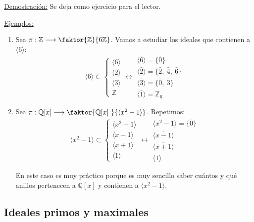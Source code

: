 \documentclass[10pt, a4paper]{article}
\newcommand{\Z}{\mathbb{Z}}
\newcommand{\Q}{\mathbb{Q}}
\newcommand{\ejs}{\underline{Ejemplos:} }
\newcommand{\demo}{\underline{Demostración:} }
\newenvironment{enumeratea}{\begin{enumerate}[label=\arabic*)]}
{\end{enumerate}}
\begin{document}
\demo Se deja como ejercicio para el lector.

\vspace{3mm}

\ejs
\begin{enumeratea}
	\item Sea $\pi : \Z \longrightarrow \faktor{\Z}{6\Z}$. Vamos a estudiar los ideales que contienen a $\langle 6 \rangle$:
		\[
		\langle 6 \rangle \subset \left \{
		\begin{array}{c}
			\langle 6 \rangle \\
			\langle 2 \rangle \\
			\langle 3 \rangle \\
			\Z		
		\end{array}
		\right .
		\longleftrightarrow
		\begin{array}{l}
			\langle \bar{6} \rangle = \{\bar{0}\} \\
			\langle \bar{2} \rangle = \{\bar{2},\ \bar{4},\ \bar{6}\} \\
			\langle \bar{3} \rangle = \{\bar{0},\ \bar{3}\} \\
			\langle \bar{1} \rangle = \Z_6
		\end{array}
		\]
		\item Sea $\pi : \Q[x] \longrightarrow \faktor{\Q[x]\ }{\langle x^2 - 1 \rangle}$. Repetimos:
			\[
			\langle x^2 - 1 \rangle \subset \left \{
			\begin{array}{c}
				\langle x^2 - 1 \rangle \\
				\langle x - 1 \rangle \\
				\langle x + 1 \rangle \\
				\langle 1 \rangle		
			\end{array}
			\right .
			\longleftrightarrow
			\begin{array}{l}
				\langle \overline{x^2 - 1} \rangle = \{\bar{0}\} \\
				\langle \overline{x - 1} \rangle \\
				\langle \overline{x + 1} \rangle \\
				\langle \overline{1} \rangle
			\end{array}
			\]

			En este caso es muy práctico porque es muy sencillo saber cuántos y qué anillos pertenecen a $\Q[x]$ y contienen a $\langle x^2 - 1 \rangle$.
\end{enumeratea}

\vspace{3mm}


\subsection{Ideales primos y maximales}
\end{document}
